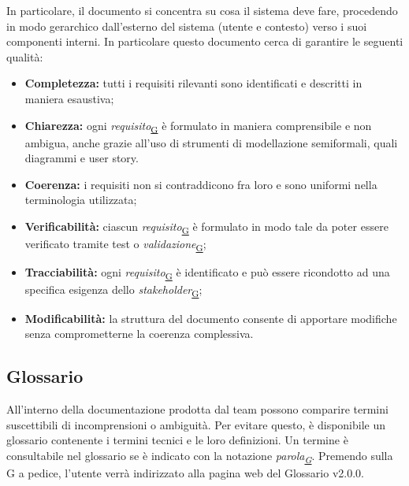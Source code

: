 ﻿\documentclass[a4paper,12pt]{article}
\begin{document}
{{      In particolare, il documento si concentra su cosa il sistema deve fare, procedendo in modo gerarchico dall'esterno del sistema (utente e contesto) verso i suoi componenti interni.
      \newline
      In particolare questo documento cerca di garantire le seguenti qualità:
      \begin{itemize}
          \item \textbf{Completezza:} tutti i requisiti rilevanti sono identificati e descritti in maniera esaustiva;
          \item \textbf{Chiarezza:} ogni \textit{requisito}\textsubscript{\href{https://atlasteam9.github.io/Atlas/glossario.html\#Requisito}{G}} è formulato in maniera comprensibile e non ambigua, anche grazie all'uso di strumenti di modellazione semiformali,
                quali diagrammi e user story.
          \item \textbf{Coerenza:} i requisiti non si contraddicono fra loro e sono uniformi nella terminologia utilizzata;
          \item \textbf{Verificabilità:} ciascun \textit{requisito}\textsubscript{\href{https://atlasteam9.github.io/Atlas/glossario.html\#Requisito}{G}} è formulato in modo tale da poter essere verificato tramite test o \textit{validazione}\textsubscript{\href{https://atlasteam9.github.io/Atlas/glossario.html\#Validazione}{G}};
          \item \textbf{Tracciabilità:} ogni \textit{requisito}\textsubscript{\href{https://atlasteam9.github.io/Atlas/glossario.html\#Requisito}{G}} è identificato e può essere ricondotto ad una specifica esigenza dello \textit{stakeholder}\textsubscript{\href{https://atlasteam9.github.io/Atlas/glossario.html\#Stakeholder}{G}};
          \item \textbf{Modificabilità:} la struttura del documento consente di apportare modifiche senza comprometterne la coerenza complessiva.
      \end{itemize}
  }

  \subsection{Glossario}{
      All'interno della documentazione prodotta dal team possono comparire termini suscettibili di incomprensioni o ambiguità. Per evitare questo, è disponibile un glossario
      contenente i termini tecnici e le loro definizioni. Un termine è consultabile nel glossario se è indicato con la notazione \textit{parola\textsubscript{\href{https://atlasteam9.github.io/Atlas/glossario.html}{G}}}.
      Premendo sulla G a pedice, l'utente verrà indirizzato alla pagina web del Glossario v2.0.0.
  }

}
\end{document}
